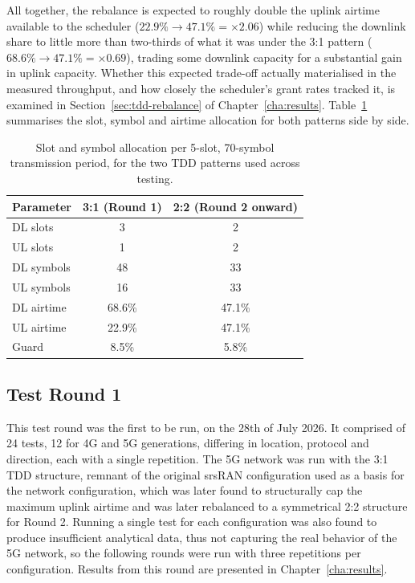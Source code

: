 All together, the rebalance is expected to roughly double the uplink airtime available to the scheduler ($22.9\% \rightarrow 47.1\% = \times2.06$) while reducing the downlink share to little more than two-thirds of what it was under the 3:1 pattern ($68.6\% \rightarrow 47.1\% = \times0.69$), trading some downlink capacity for a substantial gain in uplink capacity. Whether this expected trade-off actually materialised in the measured throughput, and how closely the scheduler's grant rates tracked it, is examined in Section~\ref{sec:tdd-rebalance} of Chapter~\ref{cha:results}. Table~\ref{tab:tdd-comparison} summarises the slot, symbol and airtime allocation for both patterns side by side.

\begin{table}[htbp]
    \centering
    \begin{tabular}{|l|c|c|}
        \hline
        \textbf{Parameter} & \textbf{3:1 (Round 1)} & \textbf{2:2 (Round 2 onward)} \\
        \hline
        DL slots & 3 & 2 \\
        \hline
        UL slots & 1 & 2 \\
        \hline
        DL symbols & 48 & 33 \\
        \hline
        UL symbols & 16 & 33 \\
        \hline
        DL airtime & 68.6\% & 47.1\% \\
        \hline
        UL airtime & 22.9\% & 47.1\% \\
        \hline
        Guard & 8.5\% & 5.8\% \\
        \hline
    \end{tabular}
    \caption{Slot and symbol allocation per 5-slot, 70-symbol transmission period, for the two TDD patterns used across testing.}
    \label{tab:tdd-comparison}
\end{table}

\subsection{Test Round 1}
\label{sec:test-round-1}

This test round was the first to be run, on the 28th of July 2026. It comprised of 24 tests, 12 for 4G and 5G generations, differing in location, protocol and direction, each with a single repetition. The 5G network was run with the 3:1 TDD structure, remnant of the original srsRAN configuration used as a basis for the network configuration, which was later found to structurally cap the maximum uplink airtime and was later rebalanced to a symmetrical 2:2 structure for Round 2. Running a single test for each configuration was also found to produce insufficient analytical data, thus not capturing the real behavior of the 5G network, so the following rounds were run with three repetitions per configuration. Results from this round are presented in Chapter~\ref{cha:results}.

